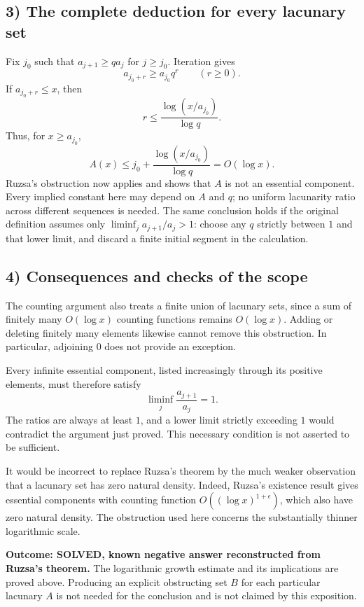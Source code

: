 \subsection{3) The complete deduction for every lacunary set}
Fix $j_0$ such that $a_{j+1}\geq q a_j$ for $j\geq j_0$.
Iteration gives
\[
 a_{j_0+r}\geq a_{j_0}q^r\qquad(r\geq0).
\]
If $a_{j_0+r}\leq x$, then
\[
 r\leq\frac{\log(x/a_{j_0})}{\log q}.
\]
Thus, for $x\geq a_{j_0}$,
\[
 A(x)\leq j_0+\frac{\log(x/a_{j_0})}{\log q}=O(\log x).
\]
Ruzsa's obstruction now applies and shows that $A$ is not an essential
component. Every implied constant here may depend on $A$ and $q$;
no uniform lacunarity ratio across different sequences is needed.
The same conclusion holds if the original definition assumes only
$\liminf_j a_{j+1}/a_j>1$: choose any $q$ strictly between $1$ and that
lower limit, and discard a finite initial segment in the calculation.

\subsection{4) Consequences and checks of the scope}
The counting argument also treats a finite union of lacunary sets,
since a sum of finitely many $O(\log x)$ counting functions remains
$O(\log x)$. Adding or deleting finitely many elements likewise cannot
remove this obstruction. In particular, adjoining $0$ does not provide
an exception.

Every infinite essential component, listed increasingly through its
positive elements, must therefore satisfy
\[
 \liminf_j\frac{a_{j+1}}{a_j}=1.
\]
The ratios are always at least $1$, and a lower limit strictly exceeding
$1$ would contradict the argument just proved. This necessary condition
is not asserted to be sufficient.

It would be incorrect to replace Ruzsa's theorem by the much weaker
observation that a lacunary set has zero natural density. Indeed,
Ruzsa's existence result gives essential components with counting
function $O((\log x)^{1+\epsilon})$, which also have zero natural
density. The obstruction used here concerns the substantially thinner
logarithmic scale.

\textbf{Outcome: SOLVED, known negative answer reconstructed from
Ruzsa's theorem.} The logarithmic growth estimate and its implications
are proved above. Producing an explicit obstructing set $B$ for each
particular lacunary $A$ is not needed for the conclusion and is not
claimed by this exposition.

